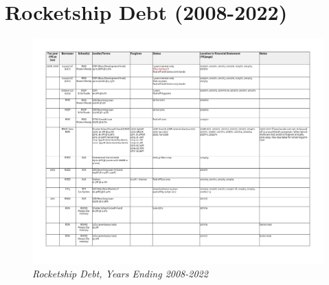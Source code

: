 
\chapter{Rocketship Debt (2008-2022)}\label{appx:debt_2010-22}

\begin{landscape}
  \begin{figure}[ht]
    \vspace{-0.25in}
    \caption[Rocketship Debt, Years Ending 2008–2022]{\textit{Rocketship Debt, Years Ending 2008-2022}}%
    \label{fig:debt_2008-2022} %
    \includegraphics[page=1,scale=0.8]{Debt_2008-2022} %
  \end{figure}
\end{landscape}


